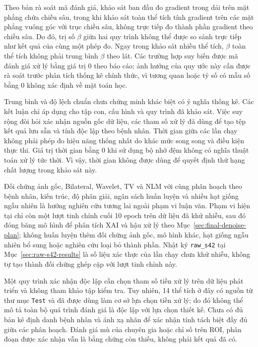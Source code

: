 \documentclass[14pt,a4paper,oneside]{extreport}
\begin{document}
Theo bản rà soát mã đánh giá, khảo sát ban đầu đo gradient trong
dải trên mặt phẳng chứa chiều sâu, trong khi khảo sát toàn thể
tích tính gradient trên các mặt phẳng vuông góc với trục chiều
sâu, không trực tiếp đo thành phần gradient theo chiều sâu.
Do đó, trị số $\beta$ giữa hai quy trình không thể được so sánh trực tiếp
như kết quả của cùng một phép đo. Ngay trong khảo sát nhiều thể tích, $\beta$
toàn thể tích không phải trung bình $\beta$ theo lát. Các trường
hợp suy biến được mã đánh giá xử lý bằng giá trị 0 theo báo cáo;
ảnh hưởng của quy ước này cần được rà soát trước phân tích thống
kê chính thức, vì tương quan hoặc tỷ số có mẫu số bằng 0 không
xác định về mặt toán học.

Trung bình và độ lệch chuẩn chưa chứng minh khác biệt có ý nghĩa
thống kê. Các kết luận chỉ áp dụng cho tập con, cấu hình và quy
trình đã khảo sát. Việc suy rộng đòi hỏi xác nhận nguồn gốc dữ liệu,
các tham số xử lý đã dùng để tạo tệp kết quả lưu sẵn và tính độc lập
theo bệnh nhân. Thời gian giữa
các lần chạy không phải phép đo hiệu năng thống nhất do khác mức song
song và điều kiện thực thi. Giá trị thời gian bằng 0 khi sử dụng
bộ nhớ đệm không có nghĩa thuật toán xử lý tức thời. Vì vậy, thời gian
không được dùng để quyết định thứ hạng chất lượng trong khảo sát này.

Đối chứng ảnh gốc, Bilateral, Wavelet, TV và NLM với cùng phân hoạch
theo bệnh nhân, kiến trúc, độ phân giải, ngân sách huấn luyện và nhiều
hạt giống ngẫu nhiên là hướng nghiên cứu tương lai ngoài phạm vi luận văn.
Phạm vi hiện tại chỉ còn một lượt tinh chỉnh cuối 10 epoch trên dữ liệu
đã khử nhiễu, sau đó đóng băng mô hình để phân tích XAI và hậu xử lý theo
Mục~\ref{sec:final-denoise-plan}; không huấn luyện thêm đối chứng ảnh gốc,
mô hình khác, hạt giống ngẫu nhiên bổ sung hoặc nghiên cứu loại bỏ thành phần. Nhật ký
\texttt{raw\_s42} tại Mục~\ref{sec:raw-s42-results} là số liệu xác thực
của lần chạy chưa khử nhiễu, không tự tạo thành đối chứng ghép cặp với
lượt tinh chỉnh này.

Một quy trình xác nhận độc lập cần chọn tham số tiền xử lý trên dữ liệu
phát triển và không tham khảo tập kiểm tra. Tuy nhiên, 14 thể tích ở đây
có nguồn từ thư mục \texttt{Test} và đã được dùng làm cơ sở lựa chọn
tiền xử lý; do đó không thể mô tả toàn bộ quá trình đánh giá là độc lập
với lựa chọn thiết kế. Chưa có đủ bản kê định danh bệnh nhân và ánh xạ
nhãn để xác nhận tính tách biệt đầy đủ giữa các phân hoạch. Đánh giá mù
của chuyên gia hoặc chỉ số trên ROI, phân đoạn được xác nhận vẫn là
bằng chứng còn thiếu, không phải kết quả đã có.
\end{document}
